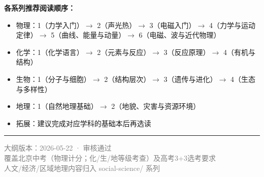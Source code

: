 \documentclass[a4paper,12pt]{ctexart}
\begin{document}
\vspace{0.3cm}

\noindent\textbf{各系列推荐阅读顺序：}
\begin{itemize}
  \item 物理：1（力学入门）$\rightarrow$ 2（声光热）$\rightarrow$ 3（电磁入门）$\rightarrow$ 4（力学与运动定律）$\rightarrow$ 5（曲线、能量与动量）$\rightarrow$ 6（电磁、波与近代物理）
  \item 化学：1（化学语言）$\rightarrow$ 2（元素与反应）$\rightarrow$ 3（反应原理）$\rightarrow$ 4（有机与结构）
  \item 生物：1（分子与细胞）$\rightarrow$ 2（结构层次）$\rightarrow$ 3（遗传与进化）$\rightarrow$ 4（生态与多样性）
  \item 地理：1（自然地理基础）$\rightarrow$ 2（地貌、灾害与资源环境）
  \item 拓展：建议完成对应学科的基础本后再选读
\end{itemize}

\vspace{0.5cm}

\begin{center}
\rule{0.5\textwidth}{0.5pt}
\vspace{0.3cm}
\textcolor{gray}{\small 大纲版本：2026-05-22 · 审核通过}\\
\textcolor{gray}{\small 覆盖北京中考（物理计分；化/生/地等级考查）及高考3+3选考要求}\\
\textcolor{gray}{\small 人文/经济/区域地理内容归入 social-science/ 系列}
\end{center}
\end{document}
